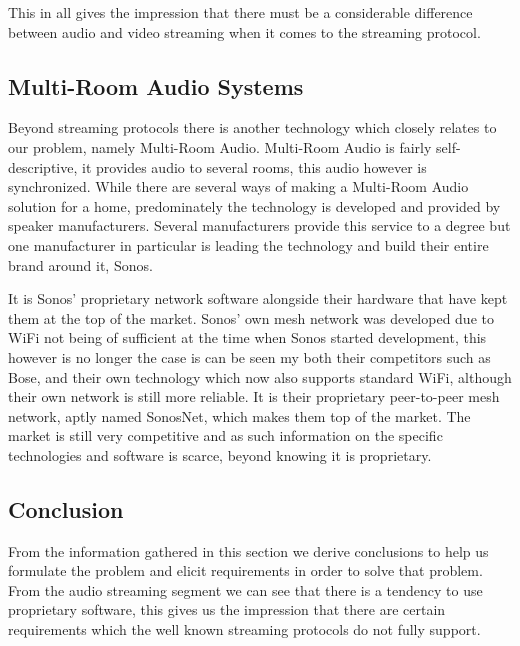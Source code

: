 This in all gives the impression that there must be a considerable difference between audio and video streaming when it comes to the streaming protocol.

\subsection{Multi-Room Audio Systems}
Beyond streaming protocols there is another technology which closely relates to our problem, namely Multi-Room Audio.
Multi-Room Audio is fairly self-descriptive, it provides audio to several rooms, this audio however is synchronized.
While there are several ways of making a Multi-Room Audio solution for a home, predominately the technology is developed and provided by speaker manufacturers.
Several manufacturers provide this service to a degree but one manufacturer in particular is leading the technology and build their entire brand around it, Sonos.

It is Sonos' proprietary network software alongside their hardware that have kept them at the top of the market.
Sonos' own mesh network was developed due to WiFi not being of sufficient at the time when Sonos started development, this however is no longer the case is can be seen my both their competitors such as Bose, and their own technology which now also supports standard WiFi, although their own network is still more reliable. %
It is their proprietary peer-to-peer mesh network, aptly named SonosNet, which makes them top of the market. %
The market is still very competitive and as such information on the specific technologies and software is scarce, beyond knowing it is proprietary.



\subsection{Conclusion}
From the information gathered in this section we derive conclusions to help us formulate the problem and elicit requirements in order to solve that problem.
From the audio streaming segment we can see that there is a tendency to use proprietary software, this gives us the impression that there are certain requirements which the well known streaming protocols do not fully support. 

